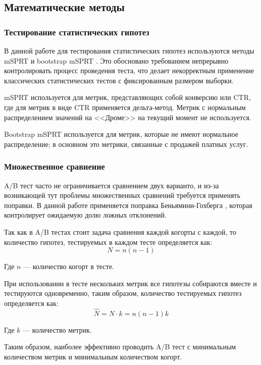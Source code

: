 \documentclass[../document.tex]{subfiles}
\begin{document}
	\subsection{Математические методы}
	\subsubsection{Тестирование статистических гипотез}
	\par В данной работе для тестирования статистических гипотез используются методы mSPRT \cite{johari_peeking} и bootstrap mSPRT \cite{bootstrap_msprt}. Это обосновано требованием непрерывно контролировать процесс проведения теста, что делает некорректным применение классических статистических тестов с фиксированным размером выборки.
	\par mSPRT используется для метрик, представляющих собой конверсию или CTR, где для метрик в виде CTR применяется дельта-метод\cite{delta_method}. Метрик с нормальным распределением значений на <<Дроме>> на текущий момент не используется.
	\par Bootstrap mSPRT используется для метрик, которые не имеют нормальное распределение; в основном это метрики, связанные с продажей платных услуг.
	\subsubsection{Множественное сравнение}
	\par A/B тест часто не ограничивается сравнением двух варианто, и из-за возникающей тут проблемы множественных сравнений требуется применять поправки. В данной работе применяется поправка Беньямини-Гохберга \cite{benjamini_hochberg}, которая контролирует ожидаемую долю ложных отклонений.
	\par Так как в A/B тестах стоит задача сравнения каждой когорты с каждой, то количество гипотез, тестируемых в каждом тесте определяется как:
	\begin{equation}
		N=n(n-1)
	\end{equation}
	\par Где $n$ --- количество когорт в тесте.
	\par При использовании в тесте нескольких метрик все гипотезы собираются вместе и тестируются одновременно, таким образом, количество тестируемых гипотез определяется как:
	\begin{equation}
		\hat{N}=N\cdot k=n(n-1)k
	\end{equation}
	\par Где $k$ --- количество метрик.
	\par Таким образом, наиболее эффективно проводить A/B тест с минимальным количеством метрик и минимальным количеством когорт.
\end{document}
